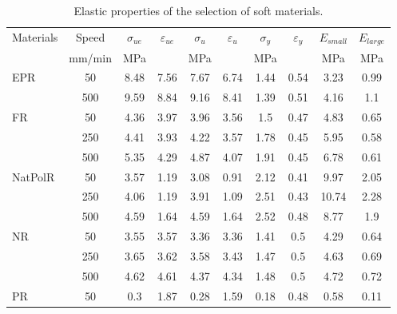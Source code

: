 \begin{table*}[htb!]
\centering
\caption{Elastic properties of the selection of soft materials.}
\label{tbl:elasticProp}
\begin{tabular}{lccccccccc} \toprule
Materials                  & Speed & $\sigma_{ue}$ & $\varepsilon_{ue}$ & $\sigma_{u}$ & $\varepsilon_{u}$ & $\sigma_{y}$ & $\varepsilon_{y}$ & $E_{small}$ & $E_{large}$ \\
                           & mm/min   & MPa &  & MPa &  & MPa &  & MPa & MPa \\
\hline
\multirow{2}{*}{EPR}      & 50    & 8.48       & 7.56       & 7.67    & 6.74    & 1.44    & 0.54    & 3.23     & 0.99      \\
                           & 500   & 9.59       & 8.84       & 9.16    & 8.41    & 1.39    & 0.51    & 4.16     & 1.1       \\
\hline
\multirow{3}{*}{FR}      & 50    & 4.36       & 3.97       & 3.96    & 3.56    & 1.5     & 0.47    & 4.83     & 0.65      \\
                           & 250   & 4.41       & 3.93       & 4.22    & 3.57    & 1.78    & 0.45    & 5.95     & 0.58      \\
                           & 500   & 5.35       & 4.29       & 4.87    & 4.07    & 1.91    & 0.45    & 6.78     & 0.61      \\
\hline
\multirow{3}{*}{NatPolR}    & 50    & 3.57       & 1.19       & 3.08    & 0.91    & 2.12    & 0.41    & 9.97     & 2.05      \\
                           & 250   & 4.06       & 1.19       & 3.91    & 1.09    & 2.51    & 0.43    & 10.74    & 2.28      \\
                           & 500   & 4.59       & 1.64       & 4.59    & 1.64    & 2.52    & 0.48    & 8.77     & 1.9       \\
\hline
\multirow{3}{*}{NR}      & 50    & 3.55       & 3.57       & 3.36    & 3.36    & 1.41    & 0.5     & 4.29     & 0.64      \\
                           & 250   & 3.65       & 3.62       & 3.58    & 3.43    & 1.47    & 0.5     & 4.63     & 0.69      \\
                           & 500   & 4.62       & 4.61       & 4.37    & 4.34    & 1.48    & 0.5     & 4.72     & 0.72      \\
\hline
\multirow{3}{*}{PR}      & 50    & 0.3        & 1.87       & 0.28    & 1.59    & 0.18    & 0.48    & 0.58     & 0.11      \\

\end{tabular}
\end{table*}
